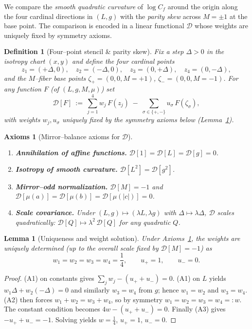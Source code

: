 \documentclass[12pt]{article}
\newtheorem{lemma}[theorem]{Lemma}
\newtheorem{definition}[theorem]{Definition}
\newtheorem*{axioms}{Axioms}
\numberwithin{equation}{section}
\begin{document}
We compare the \emph{smooth quadratic curvature} of $\log C_f$ around the origin along the four cardinal directions in $(L,g)$ with the \emph{parity skew} across $M=\pm1$ at the base point. The comparison is encoded in a linear functional $\mathcal{D}$ whose weights are uniquely fixed by symmetry axioms.

\begin{definition}[Four–point stencil \& parity skew]
Fix a step $\Delta>0$ in the isotropy chart $(x,y)$ and define the four cardinal points
\[
z_1=(+\Delta,0),\quad z_2=(-\Delta,0),\quad z_3=(0,+\Delta),\quad z_4=(0,-\Delta),
\]
and the $M$–fiber base points $\zeta_{+}=(0,0,M=+1)$, $\zeta_{-}=(0,0,M=-1)$.
For any function $F$ (of $(L,g,M,\mu)$) set
\[
\mathcal{D}[F]\ :=\ \sum_{j=1}^{4} w_j\,F(z_j)\;-\;\sum_{\sigma\in\{+,-\}} u_\sigma\,F(\zeta_\sigma),
\]
with weights $w_j,u_\sigma$ uniquely fixed by the symmetry axioms below
(Lemma~\ref{lem:weights}).
\end{definition}

\begin{axioms}[Mirror–balance axioms for $\mathcal{D}$]\label{ax:MB}
\hfill
\begin{enumerate}
\item[(A1)] \textbf{Annihilation of affine functions.} $\mathcal{D}[1]=\mathcal{D}[L]=\mathcal{D}[g]=0$.
\item[(A2)] \textbf{Isotropy of smooth curvature.} $\mathcal{D}[L^2]=\mathcal{D}[g^2]$.
\item[(A3)] \textbf{Mirror–odd normalization.} $\mathcal{D}[M]=-1$ and $\mathcal{D}[\mu(a)]=\mathcal{D}[\mu(b)]=\mathcal{D}[\mu(|c|)]=0$.
\item[(A4)] \textbf{Scale covariance.} Under $(L,g)\mapsto (\lambda L,\lambda g)$ with $\Delta\mapsto \lambda\Delta$, $\mathcal{D}$ scales quadratically: $\mathcal{D}[Q]\mapsto \lambda^2\,\mathcal{D}[Q]$ for any quadratic $Q$.
\end{enumerate}
\end{axioms}

\begin{lemma}[Uniqueness and weight solution]\label{lem:weights}
Under Axioms~\ref{ax:MB}, the weights are uniquely determined (up to the overall scale fixed by $\mathcal{D}[M]=-1$) as
\[
w_1=w_2=w_3=w_4=\frac{1}{4},\qquad u_{+}=1,\qquad u_{-}=0.
\]
\end{lemma}

\begin{proof}
(A1) on constants gives $\sum_j w_j-(u_{+}+u_{-})=0$. (A1) on $L$ yields $w_1\Delta+w_2(-\Delta)=0$ and similarly $w_3=w_4$ from $g$; hence $w_1=w_2$ and $w_3=w_4$. (A2) then forces $w_1+w_2=w_3+w_4$, so by symmetry $w_1=w_2=w_3=w_4=:w$. The constant condition becomes $4w-(u_{+}+u_{-})=0$. Finally (A3) gives $-u_{+}+u_{-}=-1$. Solving yields $w=\tfrac14$, $u_{+}=1$, $u_{-}=0$.
\end{proof}
\end{document}
